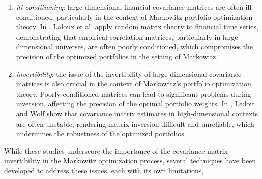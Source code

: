 \documentclass[sigconf]{acmart}
\begin{document}
\begin{enumerate}
    \item \textit{ill-conditioning}: large-dimensional financial covariance matrices are often ill-conditioned, particularly in the context of Markowitz portfolio optimization theory. In \cite{laloux}, Laloux et al. apply random matrix theory to financial time series, demonstrating that empirical correlation matrices, particularly in large-dimensional universes, are often poorly conditioned, which compromises the precision of the optimized portfolios in the setting of Markowitz.
    \item \textit{invertibility}: the issue of the invertibility of large-dimensional covariance matrices is also crucial in the context of Markowitz's portfolio optimization theory. Poorly conditioned matrices can lead to significant problems during inversion, affecting the precision of the optimal portfolio weights. In \cite{LedoitWolfConditionning}, Ledoit and Wolf show that covariance matrix estimates in high-dimensional contexts are often unstable, rendering matrix inversion difficult and unreliable, which undermines the robustness of the optimized portfolios.
\end{enumerate}

While these studies underscore the importance of the covariance matrix invertibility in the Markowitz optimization process, several techniques have been developed to address these issues, each with its own limitations,
\end{document}
